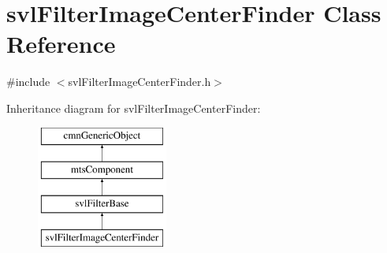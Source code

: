 \hypertarget{classsvl_filter_image_center_finder}{}\section{svl\+Filter\+Image\+Center\+Finder Class Reference}
\label{classsvl_filter_image_center_finder}


{\ttfamily \#include $<$svl\+Filter\+Image\+Center\+Finder.\+h$>$}

Inheritance diagram for svl\+Filter\+Image\+Center\+Finder\+:\begin{figure}[H]
\begin{center}
\leavevmode
\includegraphics[height=4.000000cm]{dc/d0c/classsvl_filter_image_center_finder}
\end{center}
\end{figure}
